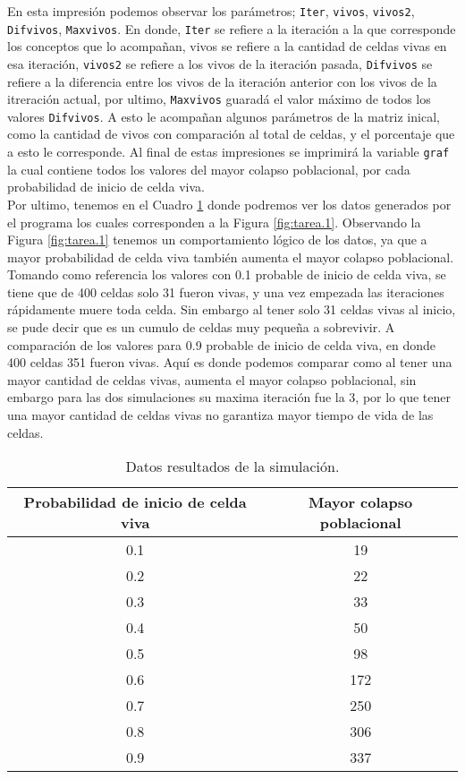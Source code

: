 \documentclass{article}
\begin{document}
En esta impresión podemos observar los parámetros; \texttt{Iter}, \texttt{vivos}, \texttt{vivos2}, \texttt{Difvivos}, \texttt{Maxvivos}. En donde, \texttt{Iter} se refiere a la iteración a la que corresponde los conceptos que lo acompañan, vivos se refiere a la cantidad de celdas vivas en esa iteración, \texttt{vivos2} se refiere a los vivos de la iteración pasada, \texttt{Difvivos} se refiere a la diferencia entre los vivos de la iteración anterior con los vivos de la itreración actual, por ultimo, \texttt{Maxvivos} guaradá el valor máximo de todos los valores \texttt{Difvivos}. A esto le acompañan algunos parámetros de la matriz inical, como la cantidad de vivos con comparación al total de celdas, y el porcentaje que a esto le corresponde. Al final de estas impresiones se imprimirá la variable \texttt{graf} la cual contiene todos los valores del mayor colapso poblacional, por cada probabilidad de inicio de celda viva. \\

Por ultimo, tenemos en el Cuadro \ref{fig:cuadro1} donde podremos ver los datos generados por el programa los cuales corresponden a la Figura \ref{fig:tarea.1}. Observando la Figura \ref{fig:tarea.1} tenemos un comportamiento lógico de los datos, ya que a mayor probabilidad de celda viva también aumenta el mayor colapso poblacional. Tomando como referencia los valores con 0.1 probable de inicio de celda viva, se tiene que de 400 celdas solo 31 fueron vivas, y una vez empezada las iteraciones rápidamente muere toda celda. Sin embargo al tener solo 31 celdas vivas al inicio, se pude decir que es un cumulo de celdas muy pequeña a sobrevivir. A comparación de los valores para 0.9 probable de inicio de celda viva, en donde 400 celdas 351 fueron vivas. Aquí es donde podemos comparar como al tener una mayor cantidad de celdas vivas, aumenta el mayor colapso poblacional, sin embargo para las dos simulaciones su maxima iteración fue la 3, por lo que tener una mayor cantidad de celdas vivas no garantiza mayor tiempo de vida de las celdas. 

\begin{table}[H]
\centering
\caption{Datos resultados de la simulación.}
\label{fig:cuadro1}
\begin{tabular}{|c|c|}
\hline
Probabilidad de inicio de celda viva    &     Mayor colapso poblacional\\
\hline
0.1& 19\\
0.2& 22\\
0.3& 33\\
0.4& 50\\
0.5& 98\\
0.6& 172\\
0.7& 250\\
0.8& 306\\
0.9& 337\\
\hline
\end{tabular}
\end{table}
\end{document}

